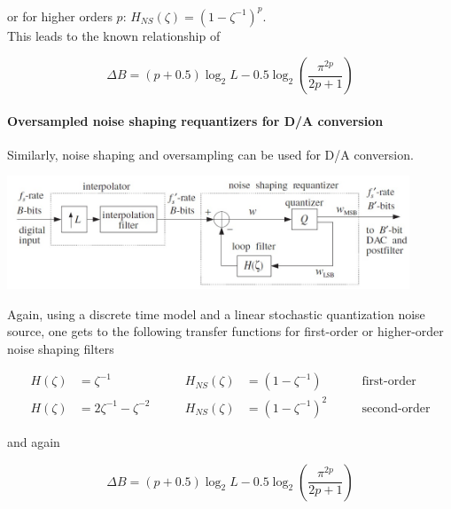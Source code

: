 or for higher orders $p$: $H_{NS}(\zeta) = (1-\zeta^{-1})^p$. \\

This leads to the known relationship of

\begin{equation*}
	\Delta B = (p+0.5) \log_2 L - 0.5 \log_2\left(\frac{\pi^{2p}}{2p+1}\right)
\end{equation*}


\paragraph{Oversampled noise shaping requantizers for D/A conversion}
Similarly, noise shaping and oversampling can be used for D/A conversion.

\begin{center}
	\includegraphics[width=12cm]{images/IntDecOv_Requantizer.jpg}
\end{center}

Again, using a discrete time model and a linear stochastic quantization
noise source, one gets to the following transfer functions for first-order 
or higher-order noise shaping filters

\begin{align*}
	H(\zeta) &= \zeta^{-1} \qquad &
	H_{NS}(\zeta) &= (1-\zeta^{-1}) \qquad
	& \text{first-order} \\
	H(\zeta) &= 2 \zeta^{-1} - \zeta^{-2} \qquad &
	H_{NS}(\zeta) &= (1-\zeta^{-1})^2 \qquad
	& \text{second-order}
\end{align*}

and again

\begin{equation*}
	\Delta B = (p+0.5) \log_2 L - 0.5 \log_2\left(\frac{\pi^{2p}}{2p+1}\right)
\end{equation*}